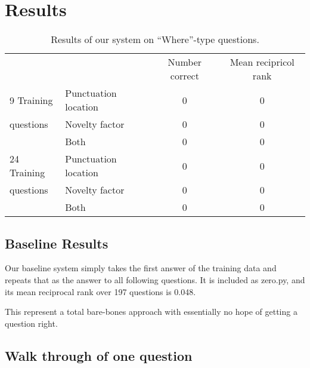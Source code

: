 \documentclass{article}
\begin{document}
\section{Results}
\begin{table}
\begin{tabular}{llcc}
\cmidrule{2-4}
               &       & Number correct & Mean recipricol rank\\
\cmidrule{2-4}
9 Training&Punctuation location &   0            &      0              \\
questions&Novelty factor       &    0           &       0             \\
&Both                 &             0  &                0    \\
\cmidrule{2-4}
24 Training&Punctuation location &  0             &    0                \\
questions&Novelty factor       &    0           &      0              \\
&Both                 &             0  &               0     \\
\cmidrule{2-4}
\end{tabular}
\caption{\label{tab:results}Results of our system on ``Where''-type questions. }
\end{table}

\subsection{Baseline Results}
Our baseline system simply takes the first answer of the training data and
repeats that as the answer to all following questions. It is included as
zero.py, and its mean reciprocal rank over 197 questions is 0.048.  

This represent a total bare-bones approach with essentially no hope of getting a
question right.

\subsection{Walk through of one question}
\end{document}
